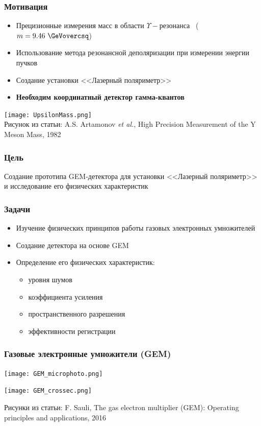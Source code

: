 \documentclass[14pt]{beamer}
\begin{document}
\begin{frame}
	\frametitle{Мотивация}
	\begin{minipage}[h]{0.55\linewidth}
	\small{
	\begin{itemize}
		\item Прецизионные измерения масс в области $\Upsilon-\text{резонанса}$
		~($m = 9.46~\GeVovercsq$) 
		\item Использование метода резонансной деполяризации при измерении энергии пучков
		\item Создание установки <<Лазерный поляриметр>>
		\item \textbf{Необходим координатный детектор гамма-квантов}
	\end{itemize}}
	\hfill
	\end{minipage}
		\begin{minipage}[h]{0.43\linewidth}
			\texttt{[image: UpsilonMass.png]}
			\\\tiny{Рисунок из статьи: A.S. Artamonov \emph{et al.}, High Precision Measurement of the Y Meson Mass, 1982}
		\end{minipage}
	\end{frame}

\begin{frame}
\frametitle{Цель}
Создание прототипа GEM-детектора для установки <<Лазерный поляриметр>> и исследование его физических характеристик
\end{frame}

\begin{frame}[t]
\frametitle{Задачи}
	\begin{itemize}
		\item Изучение физических принципов работы газовых электронных умножителей
		\item Создание детектора на основе GEM 
		\item Определение его физических характеристик:
		\begin{itemize}
			\item уровня шумов
			\item коэффициента усиления
			\item пространственного разрешения
			\item эффективности регистрации
		\end{itemize}
	\end{itemize}
\end{frame}

\begin{frame}
\frametitle{Газовые электронные умножители (GEM)}
\begin{center}
	\begin{minipage}[h]{0.49\linewidth}
		\texttt{[image: GEM\_microphoto.png]}
	\end{minipage}
	\begin{minipage}[h]{0.49\linewidth}
		\texttt{[image: GEM\_crossec.png]}
	\end{minipage}
	\tiny{Рисунки из статьи: F. Sauli, The gas electron multiplier (GEM): Operating principles and applications, 2016}
	
\end{center}
\end{frame}
\end{document}
